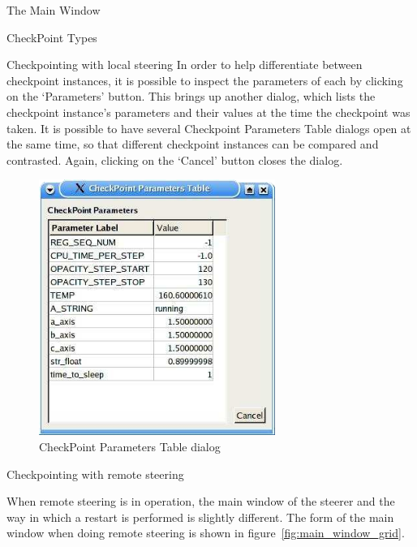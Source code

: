 \documentclass[a4paper,twoside]{article}
\begin{document}
\begin{section}{The Main Window}
\begin{subsection}{CheckPoint Types}
\begin{subsubsection}{Checkpointing with local steering}
In order to help differentiate between checkpoint instances, it is
possible to inspect the parameters of each by clicking on the
`Parameters' button. This brings up another dialog, which lists the
checkpoint instance's parameters and their values at the time the
checkpoint was taken. It is possible to have several Checkpoint
Parameters Table dialogs open at the same time, so that different
checkpoint instances can be compared and contrasted.  Again, clicking
on the `Cancel' button closes the dialog.

\begin{figure}
\centerline{\includegraphics{chk_params.png}}
\caption{CheckPoint Parameters Table dialog}
\label{fig:chk_params_dialog}
\end{figure}

\end{subsubsection}


\begin{subsubsection}{Checkpointing with remote steering}

When remote steering is in operation, the main window of the steerer
and the way in which a restart is performed is slightly different.
The form of the main window when doing remote steering is shown in
figure~\ref{fig:main_window_grid}.


\end{subsubsection}
\end{subsection}
\end{section}
\end{document}
